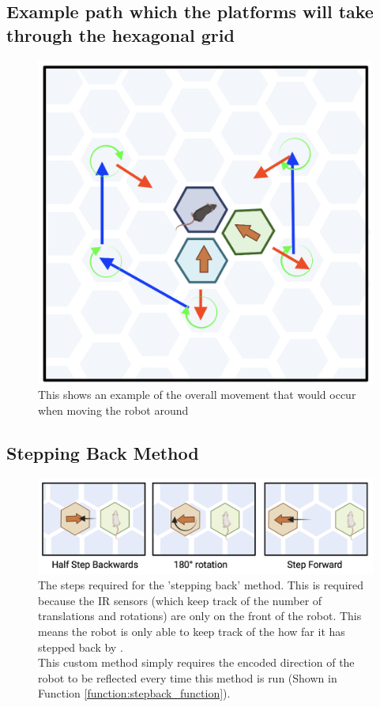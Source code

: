 \subsection{Example path which the platforms will take through the hexagonal grid}
\label{fig:example_path}
\begin{figure}[H]
    \centering
    \includegraphics[scale=0.4]{images/overview_of_algorithm.png}
    \caption{This shows an example of the overall movement that would occur when moving the robot around}
    \label{fig:overview_of_algorithm}
\end{figure}

\subsection{Stepping Back Method}
\label{fig:stepping_back_method}
\begin{figure}[H]
    \centering
    \includegraphics[scale=0.5]{images/stepback_method.png}
    \caption{The steps required for the 'stepping back' method. This is required because the IR sensors (which keep track of the number of translations and rotations) are only on the front of the robot. This means the robot is only able to keep track of the how far it has stepped back by .
    \\ This custom method simply requires the encoded direction of the robot to be reflected every time this method is run (Shown in Function \ref{function:stepback_function}).
    }
\end{figure}

